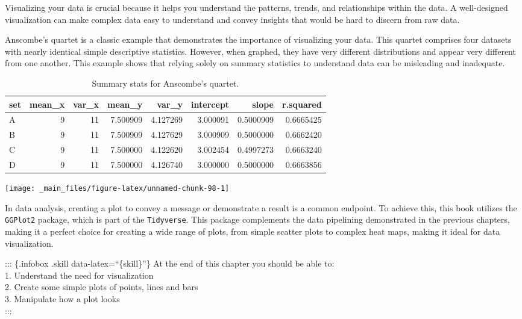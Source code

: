 \documentclass[
]{book}
\begin{document}
Visualizing your data is crucial because it helps you understand the patterns, trends, and relationships within the data. A well-designed visualization can make complex data easy to understand and convey insights that would be hard to discern from raw data.

Anscombe's quartet is a classic example that demonstrates the importance of visualizing your data. This quartet comprises four datasets with nearly identical simple descriptive statistics. However, when graphed, they have very different distributions and appear very different from one another. This example shows that relying solely on summary statistics to understand data can be misleading and inadequate.

\begin{table}

\caption{\label{tab:unnamed-chunk-97}Summary stats for Anscombe's quartet.}
\centering
\begin{tabular}[t]{l|r|r|r|r|r|r|r}
\hline
set & mean\_x & var\_x & mean\_y & var\_y & intercept & slope & r.squared\\
\hline
A & 9 & 11 & 7.500909 & 4.127269 & 3.000091 & 0.5000909 & 0.6665425\\
\hline
B & 9 & 11 & 7.500909 & 4.127629 & 3.000909 & 0.5000000 & 0.6662420\\
\hline
C & 9 & 11 & 7.500000 & 4.122620 & 3.002454 & 0.4997273 & 0.6663240\\
\hline
D & 9 & 11 & 7.500000 & 4.126740 & 3.000000 & 0.5000000 & 0.6663856\\
\hline
\end{tabular}
\end{table}

\begin{center}\texttt{[image: \_main\_files/figure-latex/unnamed-chunk-98-1]} \end{center}

In data analysis, creating a plot to convey a message or demonstrate a result is a common endpoint. To achieve this, this book utilizes the \texttt{GGPlot2} package, which is part of the \texttt{Tidyverse}. This package complements the data pipelining demonstrated in the previous chapters, making it a perfect choice for creating a wide range of plots, from simple scatter plots to complex heat maps, making it ideal for data visualization.

\hfill\break
::: \{.infobox .skill data-latex=``\{skill\}''\}
At the end of this chapter you should be able to:\\
1. Understand the need for visualization\\
2. Create some simple plots of points, lines and bars\\
3. Manipulate how a plot looks\\
:::\\
\strut \\
\end{document}
